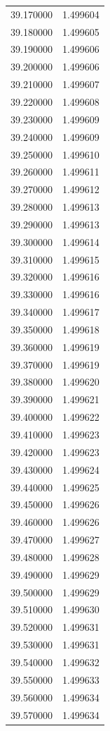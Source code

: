 \begin{tabular}{rr}
39.170000 & 1.499604 \\
39.180000 & 1.499605 \\
39.190000 & 1.499606 \\
39.200000 & 1.499606 \\
39.210000 & 1.499607 \\
39.220000 & 1.499608 \\
39.230000 & 1.499609 \\
39.240000 & 1.499609 \\
39.250000 & 1.499610 \\
39.260000 & 1.499611 \\
39.270000 & 1.499612 \\
39.280000 & 1.499613 \\
39.290000 & 1.499613 \\
39.300000 & 1.499614 \\
39.310000 & 1.499615 \\
39.320000 & 1.499616 \\
39.330000 & 1.499616 \\
39.340000 & 1.499617 \\
39.350000 & 1.499618 \\
39.360000 & 1.499619 \\
39.370000 & 1.499619 \\
39.380000 & 1.499620 \\
39.390000 & 1.499621 \\
39.400000 & 1.499622 \\
39.410000 & 1.499623 \\
39.420000 & 1.499623 \\
39.430000 & 1.499624 \\
39.440000 & 1.499625 \\
39.450000 & 1.499626 \\
39.460000 & 1.499626 \\
39.470000 & 1.499627 \\
39.480000 & 1.499628 \\
39.490000 & 1.499629 \\
39.500000 & 1.499629 \\
39.510000 & 1.499630 \\
39.520000 & 1.499631 \\
39.530000 & 1.499631 \\
39.540000 & 1.499632 \\
39.550000 & 1.499633 \\
39.560000 & 1.499634 \\
39.570000 & 1.499634 \\

\end{tabular}
